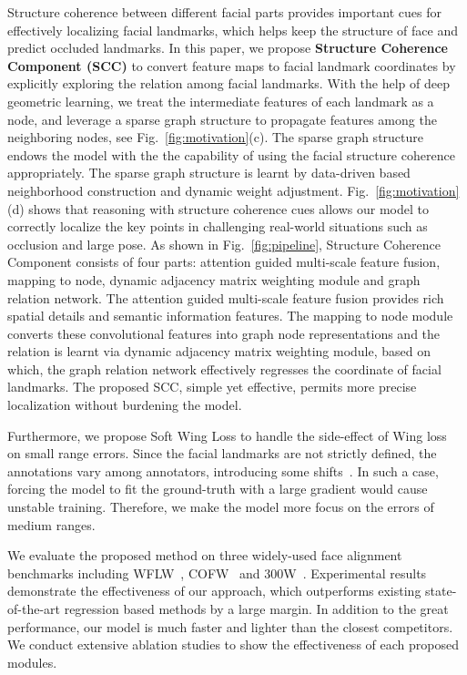 \documentclass[runningheads]{llncs}
\begin{document}
Structure coherence between different facial parts provides important cues for effectively localizing facial landmarks, which helps keep the structure of face and predict occluded landmarks. 
In this paper, we propose \textbf{Structure Coherence Component (SCC)} to convert feature maps to facial landmark coordinates by explicitly exploring the relation among facial landmarks. With the help of deep geometric learning, we treat the intermediate features of each landmark as a node, and leverage a sparse graph structure to propagate features among the neighboring nodes, see Fig.~\ref{fig:motivation}(c). The sparse graph structure endows the model with the the capability of using the facial structure coherence appropriately. The sparse graph structure is learnt by data-driven based neighborhood construction and dynamic weight adjustment.
Fig.~\ref{fig:motivation}(d) shows that reasoning with structure coherence cues allows our model to correctly localize the key points in challenging real-world situations such as occlusion and large pose. 
As shown in Fig.~\ref{fig:pipeline}, Structure Coherence Component consists of four parts: attention guided multi-scale feature fusion, mapping to node,  dynamic adjacency matrix weighting module and graph relation network.  
The attention guided multi-scale feature fusion provides rich spatial details and semantic information features.
The mapping to node module converts these convolutional features into graph node representations and the relation is learnt via dynamic adjacency matrix weighting module, based on which, the graph relation network effectively regresses the coordinate of facial landmarks.
The proposed SCC, simple yet effective, permits more precise localization without burdening the model.



Furthermore, we propose Soft Wing Loss to handle the side-effect of Wing loss~\cite{wing} on small range errors.
Since the facial landmarks are not strictly defined, the annotations vary among annotators, introducing some shifts~\cite{SemAlign}.
In such a case, forcing the model to fit the ground-truth with a large gradient would cause unstable training.
Therefore, we make the model more focus on the errors of medium ranges.






We evaluate the proposed method on three widely-used face alignment benchmarks including  WFLW~\cite{lab}, COFW~\cite{RCPR} and 300W~\cite{300W}. Experimental results demonstrate the effectiveness of our approach, which outperforms existing state-of-the-art regression based methods by a large margin. 
In addition to the great performance, our model is much faster and lighter than the closest competitors.
We conduct extensive ablation studies to show the effectiveness of each proposed modules.  
\end{document}
